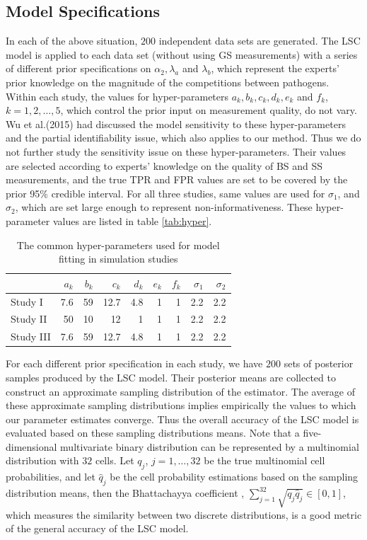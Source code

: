 \documentclass[11 pt, a4paper]{article}  %
\begin{document}
\subsection{Model Specifications}
In each of the above situation, $200$ independent data sets are generated. The LSC model is applied to each data set (without using GS measurements) with a series of different prior specifications on $\alpha_2, \lambda_a$ and $\lambda_b$, which represent the experts' prior knowledge on the magnitude of the competitions between pathogens. Within each study, the values for hyper-parameters $a_k, b_k, c_k, d_k, e_k$ and $f_k$, $k = 1, 2, \ldots, 5$, which control the prior input on measurement quality, do not vary. Wu et al.(2015) \cite{wu2015partially} had discussed the model sensitivity to these hyper-parameters and the partial identifiability issue, which also applies to our method. Thus we do not further study the sensitivity issue on these hyper-parameters. Their values are selected according to experts' knowledge on the quality of BS and SS measurements, and the true TPR and FPR values are set to be covered by the prior 95\% credible interval. For all three studies, same values are used for $\sigma_1$, and $\sigma_2$, which are set large enough to represent non-informativeness. These hyper-parameter values are listed in table \ref{tab:hyper}. \\


\begin{table}[h]
\centering
\caption{The common hyper-parameters used for model fitting in simulation studies}
\label{tab:study3}
\begin{tabular}{lrrrrrrrr}
\hline
          & $a_k$    & $b_k$     & $c_k$     & $d_k$     & $e_k$ & $f_k$ & $\sigma_1$  & $\sigma_2$    \\ \hline
Study I   & 7.6 & 59  & 12.7  & 4.8  & 1 & 1 & 2.2 & 2.2 \\
Study II  & 50 & 10  & 12  & 1  & 1 & 1 & 2.2 & 2.2 \\
Study III & 7.6 & 59  & 12.7  & 4.8  & 1 & 1 & 2.2 & 2.2 \\ \hline
\end{tabular}
\end{table}


For each different prior specification in each study, we have $200$ sets of posterior samples produced by the LSC model. Their posterior means are collected to construct an approximate sampling distribution of the estimator. The average of these approximate sampling distributions implies empirically the values to which our parameter estimates converge. Thus the overall accuracy of the LSC model is evaluated based on these sampling distributions means. Note that a five-dimensional multivariate binary distribution can be represented by a multinomial distribution with $32$ cells. Let $q_{j}$, $j = 1, \ldots, 32$ be the true multinomial cell probabilities, and let $\hat{q}_j$ be the cell probability estimations based on the sampling distribution means, then the Bhattachayya coefficient \cite{bhattachayya1943measure}, $\sum_{j=1}^{32}\sqrt{q_j \hat{q}_j} \in [0, 1]$, which measures the similarity between two discrete distributions, is a good metric of the general accuracy of the LSC model. \\
\end{document}
